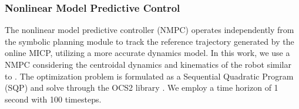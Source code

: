 \documentclass[letterpaper, 10 pt, conference]{ieeeconf}
\begin{document}
\subsubsection{Nonlinear Model Predictive Control}\label{subsec:nmpc}
The nonlinear model predictive controller (NMPC) operates independently from the symbolic planning module to track the reference trajectory generated by the online MICP, utilizing a more accurate dynamics model. In this work, we use a NMPC considering the centroidal dynamics and kinematics of the robot similar to \cite{dai2014whole,chignoli2021humanoid,sleiman2021unified}. The optimization problem is formulated as a Sequential Quadratic Program (SQP) and solve through
the OCS2 library \cite{OCS2}. We employ a time horizon of 1 second with 100 timesteps.



\end{document}
